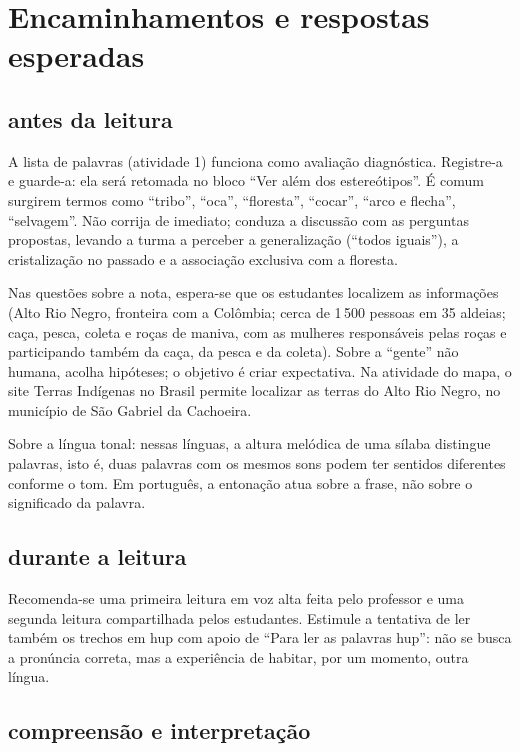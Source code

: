 \chapter{Encaminhamentos e respostas esperadas}

\section{antes da leitura}

A lista de palavras (atividade 1) funciona como avaliação diagnóstica.
Registre-a e guarde-a: ela será retomada no bloco ``Ver além dos
estereótipos''. É comum surgirem termos como ``tribo'', ``oca'',
``floresta'', ``cocar'', ``arco e flecha'', ``selvagem''. Não corrija de
imediato; conduza a discussão com as perguntas propostas, levando a turma
a perceber a generalização (``todos iguais''), a cristalização no passado
e a associação exclusiva com a floresta.

Nas questões sobre a nota, espera-se que os estudantes localizem as
informações (Alto Rio Negro, fronteira com a Colômbia; cerca de 1\,500
pessoas em 35 aldeias; caça, pesca, coleta e roças de maniva, com as
mulheres responsáveis pelas roças e participando também da caça, da pesca
e da coleta). Sobre a ``gente'' não humana, acolha hipóteses; o objetivo
é criar expectativa. Na atividade do mapa, o site Terras Indígenas no
Brasil permite localizar as terras do Alto Rio Negro, no município de
São Gabriel da Cachoeira.

Sobre a língua tonal: nessas línguas, a altura melódica de uma sílaba
distingue palavras, isto é, duas palavras com os mesmos sons podem ter
sentidos diferentes conforme o tom. Em português, a entonação atua sobre
a frase, não sobre o significado da palavra.

\section{durante a leitura}

Recomenda-se uma primeira leitura em voz alta feita pelo professor e uma
segunda leitura compartilhada pelos estudantes. Estimule a tentativa de
ler também os trechos em hup com apoio de ``Para ler as palavras hup'':
não se busca a pronúncia correta, mas a experiência de habitar, por um
momento, outra língua.

\section{compreensão e interpretação}

